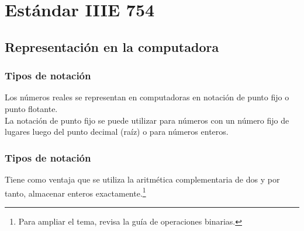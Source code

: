 \section{Estándar IIIE 754}
\subsection{Representación en la computadora}
\begin{frame}
\frametitle{Tipos de notación}
Los números reales se representan en computadoras en notación de punto fijo o punto flotante.
\\
\bigskip
La notación de punto fijo se puede utilizar para números con un número fijo de lugares luego del punto decimal (raíz) o para números enteros.
\end{frame}
\begin{frame}
\frametitle{Tipos de notación}
Tiene como ventaja que se utiliza la aritmética complementaria de dos y por tanto, almacenar enteros exactamente.\footnote{Para ampliar el tema, revisa la guía de operaciones binarias.}
\end{frame}
